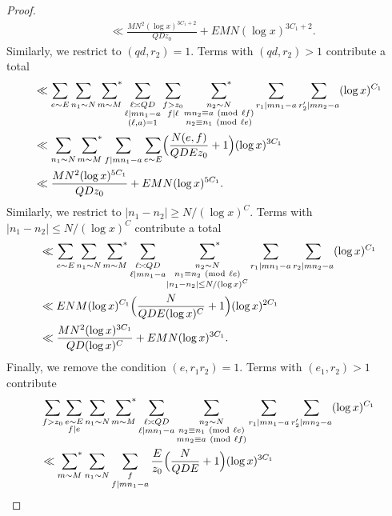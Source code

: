 \documentclass[10pt]{amsart}
\theoremstyle{plain}
\numberwithin{equation}{section}
\newcommand{\Mod}[1]{\ (\mathrm{mod}\ #1)}
\begin{document}
\begin{proof}
\begin{align*}
&\ll  \frac{MN^2(\log{x})^{3C_1+2}}{Q D z_0}+EMN(\log{x})^{3C_1+2}.
\end{align*}
Similarly, we restrict to $(qd,r_2)=1$. Terms with $(q d,r_2)>1$ contribute a total
\begin{align*}
&\ll \sum_{e\sim E}\sum_{\substack{n_1\sim N}}\,\sideset{}{^*}\sum_{m\sim  M}\sum_{\substack{\ell\asymp Q D\\ \ell|m n_1-a\\ (\ell,a)=1}}\sum_{\substack{f>z_0\\ f|\ell}}\,\sideset{}{^*}\sum_{\substack{n_2\sim N\\ m n_2\equiv a\Mod{\ell f}\\ n_2\equiv n_1\Mod{\ell e}}}\sum_{r_1|m n_1-a}\sum_{r_2'|m n_2-a}(\log{x})^{C_1}\\
&\ll \sum_{n_1\sim N}\,\sideset{}{^*}\sum_{m\sim M}\sum_{f|mn_1-a}\sum_{e\sim E}\Bigl(\frac{N(e,f)}{Q D E z_0}+1\Bigr)(\log{x})^{3C_1}\\
&\ll  \frac{MN^2(\log{x})^{5C_1}}{Q D z_0}+E MN(\log{x})^{5C_1}.
\end{align*}
Similarly, we restrict to $|n_1-n_2|\ge N/(\log{x})^C$. Terms with $|n_1-n_2|\le N/(\log{x})^C$ contribute a total
\begin{align*}
&\ll \sum_{e\sim E}\sum_{\substack{n_1\sim N}}\,\sideset{}{^*}\sum_{m\sim  M}\sum_{\substack{\ell\asymp Q D\\ \ell|m n_1-a}}\,\sideset{}{^*}\sum_{\substack{n_2\sim N\\ n_1\equiv n_2\Mod{\ell e}\\ |n_1-n_2|\le N/(\log{x})^C}}\sum_{r_1|m n_1-a}\sum_{r_2|m n_2-a}(\log{x})^{C_1}\\
&\ll ENM(\log{x})^{C_1}\Bigl(\frac{N}{Q D E(\log{x})^C}+1\Bigr)(\log{x})^{2C_1}\\
&\ll  \frac{MN^2(\log{x})^{3C_1}}{Q D (\log{x})^C}+E MN(\log{x})^{3C_1}.
\end{align*}
Finally, we remove the condition $(e,r_1r_2)=1$. Terms with $(e_1,r_2)>1$ contribute
\begin{align*}
&\sum_{f>z_0}\sum_{\substack{e\sim E\\ f|e}}\sum_{n_1\sim N}\,\sideset{}{^*}\sum_{m\sim M}\sum_{\substack{\ell\asymp Q D\\ \ell|m n_1-a}}\sum_{\substack{n_2\sim N\\ n_2\equiv n_1\Mod{\ell e}\\ m n_2\equiv a \Mod{\ell f}}}\sum_{r_1|m n_1-a}\sum_{r_2'|m n_2-a}(\log{x})^{C_1}\\
&\ll  \,\sideset{}{^*}\sum_{m\sim M}\sum_{n_1\sim N}\sum_{\substack{f\\ f|m n_1-a}}\frac{E}{z_0}\Bigl(\frac{N}{QDE}+1\Bigr)(\log{x})^{3C_1}\\

\end{align*}
\end{proof}
\end{document}
